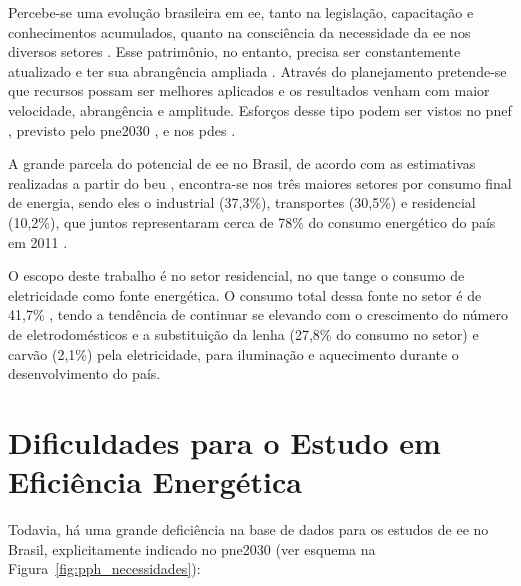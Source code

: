 Percebe-se uma evolução brasileira em \gls{ee}, tanto na legislação,
capacitação e conhecimentos acumulados, quanto na consciência da
necessidade da \gls{ee} nos diversos setores \cite{pnef}.  Esse
patrimônio, no entanto, precisa ser constantemente atualizado e ter
sua abrangência ampliada \cite{pne30_eff_energ}. Através do
planejamento pretende-se que recursos possam ser melhores aplicados e
os resultados venham com maior velocidade, abrangência e amplitude.
Esforços desse tipo podem ser vistos no \gls{pnef} \cite{pnef},
previsto pelo \gls{pne2030} \cite{pne30_eff_energ}, e nos \glspl{pde}
\cite{pde_2020}.

A grande parcela do potencial de \gls{ee} no Brasil, de acordo com as
estimativas realizadas a partir do \gls{beu} \cite{beu}, encontra-se
nos três maiores setores por consumo final de energia, sendo eles o
industrial (37,3\%), transportes (30,5\%) e residencial (10,2\%), que
juntos representaram cerca de 78\% do consumo energético do país em
2011 \cite{ben2012,epe_eficiencia_2012}.

O escopo deste trabalho é no setor residencial, no que tange o consumo
de eletricidade como fonte energética. O consumo total dessa fonte no
setor é de 41,7\% \cite{ben2012}, tendo a tendência de continuar se
elevando com o crescimento do número de eletrodomésticos e a
substituição da lenha (27,8\% do consumo no setor) e carvão (2,1\%)
pela eletricidade, para iluminação e aquecimento durante o
desenvolvimento do país. 

\section{Dificuldades para o Estudo em Eficiência Energética}
\label{sec:ee_dificuldades}

Todavia, há uma grande deficiência na base de dados para os estudos de
\gls{ee} no Brasil, explicitamente indicado no \gls{pne2030}
\cite[pp.~232]{pne30_eff_energ} (ver esquema na
Figura~\ref{fig:pph_necessidades}):

